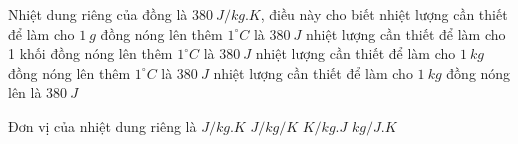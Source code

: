 

\begin{ex}
	Nhiệt dung riêng của đồng là $380 \ J/kg. K$, điều này cho biết
	\choice
	{nhiệt lượng cần thiết để làm cho $1 \ g$ đồng nóng lên thêm $1^\circ C$ là $380 \ J$}
	{nhiệt lượng cần thiết để làm cho 1 khối đồng nóng lên thêm $1^\circ C$ là $380 \ J$}
	{\True nhiệt lượng cần thiết để làm cho $1 \ kg$ đồng nóng lên thêm $1^\circ C$ là $380 \ J$}
	{nhiệt lượng cần thiết để làm cho $1 \ kg$ đồng nóng lên là $380 \ J$}
	\end{ex}

\begin{ex} 
	Đơn vị của nhiệt dung riêng là
	\choice
	{\True $J / kg . K$}
	{$J /kg / K$}
	{$K / kg. J$}
	{$kg / J . K$}
\end{ex}

